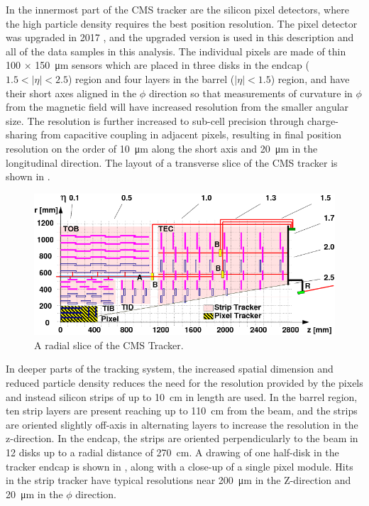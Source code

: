 In the innermost part of the CMS tracker are the silicon pixel detectors, where the high particle density requires the best position resolution. 
The pixel detector was upgraded in 2017 \cite{pixelUpgrade}, and the upgraded version is used in this description and all of the data samples in this analysis. 
The individual pixels are made of thin 100 $\times$ \SI{150}{\micro\meter} sensors which are placed in three disks in the endcap ($1.5<\lvert\eta\rvert<2.5$) region and four layers in the barrel ($\lvert\eta\rvert<1.5$) region, and have their short axes aligned in the $\phi$ direction so that measurements of curvature in $\phi$ from the magnetic field will have increased resolution from the smaller angular size. 
The resolution is further increased to sub-cell precision through charge-sharing from capacitive coupling in adjacent pixels, resulting in final position resolution on the order of \SI{10}{\micro\meter} along the short axis and \SI{20}{\micro\meter} in the longitudinal direction.
The layout of a transverse slice of the CMS tracker is shown in .

\begin{figure}[htbp]
    \includegraphics[width=1.1\textwidth]{figures/cms_tracker.png}
    \centering
    \caption{A radial slice of the CMS Tracker.}
    \label{fig:cmsTracker}
\end{figure}

In deeper parts of the tracking system, the increased spatial dimension and reduced particle density reduces the need for the resolution provided by the pixels and instead silicon strips of up to \SI{10}{\centi\meter} in length are used. 
In the barrel region, ten strip layers are present reaching up to \SI{110}{\centi\meter} from the beam, and the strips are oriented slightly off-axis in alternating layers to increase the resolution in the z-direction. 
In the endcap, the strips are oriented perpendicularly to the beam in 12 disks up to a radial distance of \SI{270}{\centi\meter}.
A drawing of one half-disk in the tracker endcap is shown in , along with a close-up of a single pixel module.
Hits in the strip tracker have typical resolutions near \SI{200}{\micro\meter} in the Z-direction and \SI{20}{\micro\meter} in the $\phi$ direction.

